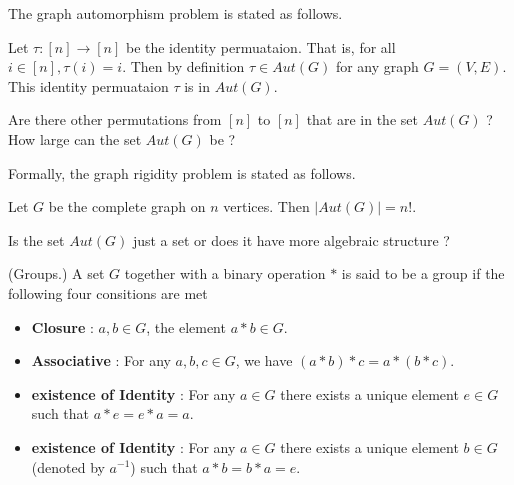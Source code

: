 The graph automorphism problem is stated as follows. 
\begin{center}
\end{center}



\begin{observation}
Let $\tau:[n]\rightarrow[n]$ be the identity permuataion. That is, for all $i\in[n],\tau(i)=i$. Then by definition $\tau\in Aut(G)$ for any graph $G=(V,E)$. This identity permuataion $\tau$ is in $Aut(G)$. 
\end{observation}


Are there other permutations from $[n]$ to $[n]$ that are in the set $Aut(G)$ ? How large can the set $Aut(G)$ be ?

Formally, the graph rigidity problem is stated as follows.
\begin{center}
\end{center}

\begin{observation}
Let $G$ be the complete graph on $n$ vertices. Then $|Aut(G)|=n!$.  
\end{observation}

Is the set $Aut(G)$ just a set or does it have more algebraic structure ? 

\begin{definition}(Groups.)
A set $G$ together with a binary operation $*$ is said to be a group if the following four consitions are met
\begin{itemize}
\item \textbf{Closure} : $a,b\in G$, the element $a*b\in G$.
\item \textbf{Associative} : For any $a,b,c\in G$, we have $(a*b)*c = a*(b*c)$.
\item \textbf{existence of Identity} : For any $a\in G$ there exists a unique element $e\in G$ such that $a*e =e*a =a$. 
\item \textbf{existence of Identity} : For any $a\in G$ there exists a unique element $b\in G$(denoted by $a^{-1}$) such that $a*b =b*a =e$. 
\end{itemize}
\end{definition}


